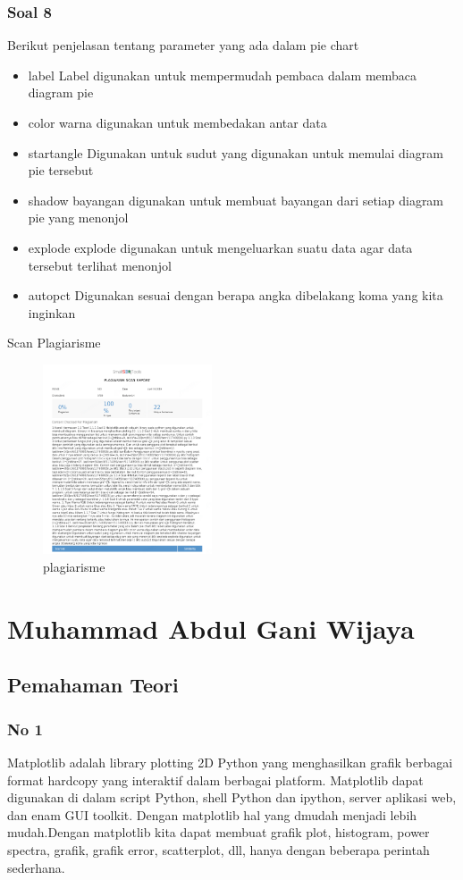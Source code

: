 \subsubsection{Soal 8}
\hfill \break
Berikut penjelasan tentang parameter yang ada dalam pie chart
\begin{itemize}
    \item label
    Label digunakan untuk mempermudah pembaca dalam membaca diagram pie
    \item color
    warna digunakan untuk membedakan antar data
    \item startangle
    Digunakan untuk sudut yang digunakan untuk memulai diagram pie tersebut
    \item shadow
    bayangan digunakan untuk membuat bayangan dari setiap diagram pie yang menonjol
    \item explode
    explode digunakan untuk mengeluarkan suatu data agar data tersebut terlihat menonjol
    \item autopct
    Digunakan sesuai dengan berapa angka dibelakang koma yang kita inginkan
\end{itemize}
\par Scan Plagiarisme
\begin{figure}[ht!]
\includegraphics[width=5cm]{figures/6/1174080/teori/PLAGIARISM.PNG}
\centering
\caption{plagiarisme}
\end{figure}


\section{Muhammad Abdul Gani Wijaya}
\subsection{Pemahaman Teori} 
\subsubsection{No 1}
Matplotlib adalah library plotting 2D Python yang menghasilkan grafik berbagai format hardcopy yang interaktif dalam berbagai platform. Matplotlib dapat digunakan di dalam script Python, shell Python dan ipython, server aplikasi web, dan enam GUI toolkit. Dengan matplotlib hal yang dmudah menjadi lebih mudah.Dengan matplotlib kita dapat membuat grafik plot, histogram, power spectra, grafik, grafik error, scatterplot, dll, hanya dengan beberapa perintah sederhana.

